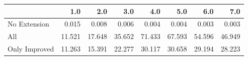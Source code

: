 \begin{tabular}{lrrrrrrr}
\toprule
{} &    1.0 &    2.0 &    3.0 &    4.0 &    5.0 &    6.0 &    7.0 \\
\midrule
No Extension  &  0.015 &  0.008 &  0.006 &  0.004 &  0.004 &  0.003 &  0.003 \\
All           & 11.521 & 17.648 & 35.652 & 71.433 & 67.593 & 54.596 & 46.949 \\
Only Improved & 11.263 & 15.391 & 22.277 & 30.117 & 30.658 & 29.194 & 28.223 \\
\bottomrule
\end{tabular}
